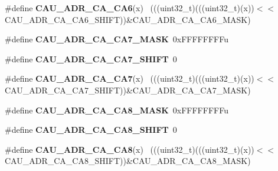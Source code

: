 \begin{DoxyCompactItemize}
\item 
\hypertarget{group___c_a_u___register___masks_gaaa9eba133017c4ff0f311e198ad248c4}{}\#define {\bfseries C\+A\+U\+\_\+\+A\+D\+R\+\_\+\+C\+A\+\_\+\+C\+A6}(x)                                            ~(((uint32\+\_\+t)(((uint32\+\_\+t)(x))$<$$<$C\+A\+U\+\_\+\+A\+D\+R\+\_\+\+C\+A\+\_\+\+C\+A6\+\_\+\+S\+H\+I\+F\+T))\&C\+A\+U\+\_\+\+A\+D\+R\+\_\+\+C\+A\+\_\+\+C\+A6\+\_\+\+M\+A\+S\+K)\label{group___c_a_u___register___masks_gaaa9eba133017c4ff0f311e198ad248c4}

\item 
\hypertarget{group___c_a_u___register___masks_ga2ea865f0bce0752907d3cf74be39c6fc}{}\#define {\bfseries C\+A\+U\+\_\+\+A\+D\+R\+\_\+\+C\+A\+\_\+\+C\+A7\+\_\+\+M\+A\+S\+K}~0x\+F\+F\+F\+F\+F\+F\+F\+Fu\label{group___c_a_u___register___masks_ga2ea865f0bce0752907d3cf74be39c6fc}

\item 
\hypertarget{group___c_a_u___register___masks_ga8bee4c551567070e18a1ed1cc5898e8f}{}\#define {\bfseries C\+A\+U\+\_\+\+A\+D\+R\+\_\+\+C\+A\+\_\+\+C\+A7\+\_\+\+S\+H\+I\+F\+T}~0\label{group___c_a_u___register___masks_ga8bee4c551567070e18a1ed1cc5898e8f}

\item 
\hypertarget{group___c_a_u___register___masks_gad37b1d37a4fafac878d92b51d35ec186}{}\#define {\bfseries C\+A\+U\+\_\+\+A\+D\+R\+\_\+\+C\+A\+\_\+\+C\+A7}(x)                                            ~(((uint32\+\_\+t)(((uint32\+\_\+t)(x))$<$$<$C\+A\+U\+\_\+\+A\+D\+R\+\_\+\+C\+A\+\_\+\+C\+A7\+\_\+\+S\+H\+I\+F\+T))\&C\+A\+U\+\_\+\+A\+D\+R\+\_\+\+C\+A\+\_\+\+C\+A7\+\_\+\+M\+A\+S\+K)\label{group___c_a_u___register___masks_gad37b1d37a4fafac878d92b51d35ec186}

\item 
\hypertarget{group___c_a_u___register___masks_ga588ce6c296b5bc630763b325bca7e346}{}\#define {\bfseries C\+A\+U\+\_\+\+A\+D\+R\+\_\+\+C\+A\+\_\+\+C\+A8\+\_\+\+M\+A\+S\+K}~0x\+F\+F\+F\+F\+F\+F\+F\+Fu\label{group___c_a_u___register___masks_ga588ce6c296b5bc630763b325bca7e346}

\item 
\hypertarget{group___c_a_u___register___masks_ga4438c1d48ac4e4e715fdd705f409e0fc}{}\#define {\bfseries C\+A\+U\+\_\+\+A\+D\+R\+\_\+\+C\+A\+\_\+\+C\+A8\+\_\+\+S\+H\+I\+F\+T}~0\label{group___c_a_u___register___masks_ga4438c1d48ac4e4e715fdd705f409e0fc}

\item 
\hypertarget{group___c_a_u___register___masks_gab2390a3b4e4e2980323f350413c61b95}{}\#define {\bfseries C\+A\+U\+\_\+\+A\+D\+R\+\_\+\+C\+A\+\_\+\+C\+A8}(x)                                            ~(((uint32\+\_\+t)(((uint32\+\_\+t)(x))$<$$<$C\+A\+U\+\_\+\+A\+D\+R\+\_\+\+C\+A\+\_\+\+C\+A8\+\_\+\+S\+H\+I\+F\+T))\&C\+A\+U\+\_\+\+A\+D\+R\+\_\+\+C\+A\+\_\+\+C\+A8\+\_\+\+M\+A\+S\+K)\label{group___c_a_u___register___masks_gab2390a3b4e4e2980323f350413c61b95}


\end{DoxyCompactItemize}
